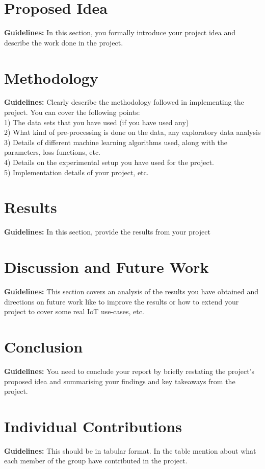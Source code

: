 \documentclass[11pt, oneside]{article}   	%
\begin{document}
\section{Proposed Idea}
\textbf{Guidelines:} In this section, you formally introduce your project idea and describe the work done in the project. 

\section{Methodology}
\textbf{Guidelines:} Clearly describe the methodology followed in implementing the project. You can cover the following points:\\
1) The data sets that you have used (if you have used any)\\
2) What kind of pre-processing is done on the data, any exploratory data analysis\\
3) Details of different machine learning algorithms used, along with the parameters, loss functions, etc.\\
4) Details on the experimental setup you have used for the project.\\
5) Implementation details of your project, etc.\\

\section{Results}
\textbf{Guidelines:} In this section, provide the results from your project

\section{Discussion and Future Work}
\textbf{Guidelines:} This section covers an analysis of the results you have obtained and directions on future work like to improve the results or how to extend your project to cover some real IoT use-cases, etc. 

\section{Conclusion}
\textbf{Guidelines:} You need to conclude your report by briefly restating the project's proposed idea and summarising your findings and key takeaways from the project.  

\section{Individual Contributions}

\textbf{Guidelines:} This should be in tabular format. In the table mention about what each member of the group have contributed in the project. 

 

\end{document}

